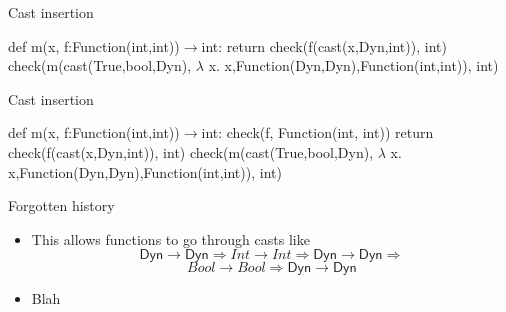 \documentclass[mathserif]{beamer}
\newcommand{\Dyn}{\textsf{Dyn}}
\begin{document}
\addtocounter{framenumber}{-1}
\begin{frame}{Cast insertion}
 \begin{algorithmic}[2]
    \State def m(x, f:Function(int,int))$\to$int:
    \State \;\;\;return check(f({\color{blue}cast(}x{\color{blue},Dyn,int)}), int)
    \State 
    \State check(m({\color{blue}cast(}True{\color{blue},bool,Dyn)}, 
    \State \;$\lambda$ x. x{\color{blue},Function(Dyn,Dyn),Function(int,int)}), int)
  \end{algorithmic}
\end{frame}

\addtocounter{framenumber}{-1}
\begin{frame}{Cast insertion}
 \begin{algorithmic}[2]
    \State def m(x, f:Function(int,int))$\to$int:
    \State \;\;\;check(f, Function(int, int))
    \State \;\;\;return check(f({\color{blue}cast(}x{\color{blue},Dyn,int)}), int)
    \State 
    \State check(m({\color{blue}cast(}True{\color{blue},bool,Dyn)}, 
    \State \;$\lambda$ x. x{\color{blue},Function(Dyn,Dyn),Function(int,int)}), int)
  \end{algorithmic}
\end{frame}

\begin{frame}{Forgotten history}
  \begin{itemize}
  \item This allows functions to go through casts like
\[\Dyn\to \Dyn \Rightarrow Int \to Int \Rightarrow \Dyn \to \Dyn \Rightarrow \]\[Bool \to Bool\Rightarrow \Dyn\to \Dyn\]
\item Blah
  \end{itemize}
\end{frame}
\end{document}
